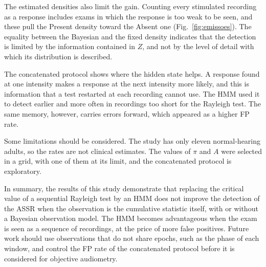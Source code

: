 \documentclass[conference]{IEEEtran}
\begin{document}
The estimated densities also limit the gain. Counting every stimulated recording as a response includes exams in which the response is too weak to be seen, and these pull the Present density toward the Absent one (Fig.~\ref{fig:emissoes}). The equality between the Bayesian and the fixed density indicates that the detection is limited by the information contained in $Z$, and not by the level of detail with which its distribution is described.

The concatenated protocol shows where the hidden state helps. A response found at one intensity makes a response at the next intensity more likely, and this is information that a test restarted at each recording cannot use. The HMM used it to detect earlier and more often in recordings too short for the Rayleigh test. The same memory, however, carries errors forward, which appeared as a higher FP rate.

Some limitations should be considered. The study has only eleven normal-hearing adults, so the rates are not clinical estimates. The values of $\pi$ and $A$ were selected in a grid, with one of them at its limit, and the concatenated protocol is exploratory.

In summary, the results of this study demonstrate that replacing the critical value of a sequential Rayleigh test by an HMM does not improve the detection of the ASSR when the observation is the cumulative statistic itself, with or without a Bayesian observation model. The HMM becomes advantageous when the exam is seen as a sequence of recordings, at the price of more false positives. Future work should use observations that do not share epochs, such as the phase of each window, and control the FP rate of the concatenated protocol before it is considered for objective audiometry.



\end{document}

